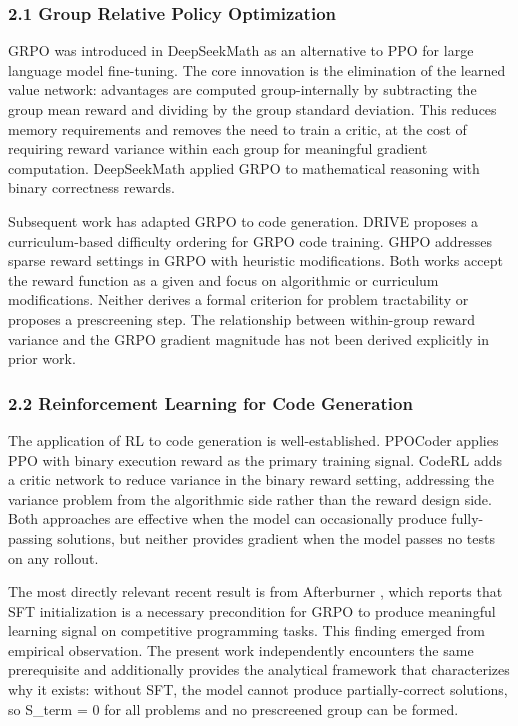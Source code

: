 
\subsubsection{2.1 Group Relative Policy Optimization}

GRPO was introduced in DeepSeekMath \citep{Shao2024} as an alternative to PPO for large language model fine-tuning. The core innovation is the elimination of the learned value network: advantages are computed group-internally by subtracting the group mean reward and dividing by the group standard deviation. This reduces memory requirements and removes the need to train a critic, at the cost of requiring reward variance within each group for meaningful gradient computation. DeepSeekMath applied GRPO to mathematical reasoning with binary correctness rewards.

Subsequent work has adapted GRPO to code generation. DRIVE \citep{Zhu2025} proposes a curriculum-based difficulty ordering for GRPO code training. GHPO \citep{Guo2025} addresses sparse reward settings in GRPO with heuristic modifications. Both works accept the reward function as a given and focus on algorithmic or curriculum modifications. Neither derives a formal criterion for problem tractability or proposes a prescreening step. The relationship between within-group reward variance and the GRPO gradient magnitude has not been derived explicitly in prior work.

\subsubsection{2.2 Reinforcement Learning for Code Generation}

The application of RL to code generation is well-established. PPOCoder \citep{Shojaee2023} applies PPO with binary execution reward as the primary training signal. CodeRL \citep{Le2022} adds a critic network to reduce variance in the binary reward setting, addressing the variance problem from the algorithmic side rather than the reward design side. Both approaches are effective when the model can occasionally produce fully-passing solutions, but neither provides gradient when the model passes no tests on any rollout.

The most directly relevant recent result is from Afterburner \citep{Du2025}, which reports that SFT initialization is a necessary precondition for GRPO to produce meaningful learning signal on competitive programming tasks. This finding emerged from empirical observation. The present work independently encounters the same prerequisite and additionally provides the analytical framework that characterizes why it exists: without SFT, the model cannot produce partially-correct solutions, so S\_term = 0 for all problems and no prescreened group can be formed.


